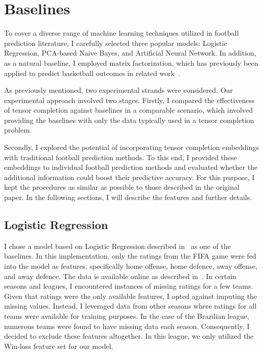 \documentclass[thesis=M,english]{FITthesis}[2019/12/23]
\begin{document}
\section{Baselines}
\label{baselines}

To cover a diverse range of machine learning techniques utilized in football prediction literature, I carefully selected three popular models: Logistic Regression, PCA-based Naive Bayes, and Artificial Neural Network. In addition, as a natural baseline, I employed matrix factorization, which has previously been applied to predict basketball outcomes in related work~\cite{NBA_matrix_factorization}.

As previously mentioned, two experimental strands were considered. Our experimental approach involved two stages. Firstly, I compared the effectiveness of tensor completion against baselines in a comparable scenario, which involved providing the baselines with only the data typically used in a tensor completion problem.

Secondly, I explored the potential of incorporating tensor completion embeddings with traditional football prediction methods. To this end, I provided these embeddings to individual football prediction methods and evaluated whether the additional information could boost their predictive accuracy. For this purpose, I kept the procedures as similar as possible to those described in the original paper. In the following sections, I will describe the features and further details.

\subsection{Logistic Regression}
\label{lr}
I chose a model based on Logistic Regression described in~\cite{BPL_logistic_regression} as one of the baselines. In this implementation, only the ratings from the FIFA game were fed into the model as features, specifically home offense, home defence, away offense, and away defence. The data is available online as described in~\cite{BPL_logistic_regression}. In certain seasons and leagues, I encountered instances of missing ratings for a few teams. Given that ratings were the only available features, I opted against imputing the missing values. Instead, I leveraged data from other seasons where ratings for all teams were available for training purposes. In the case of the Brazilian league, numerous teams were found to have missing data each season. Consequently, I decided to exclude these features altogether. In this league, we only utilized the Win-loss feature set for our model.
\end{document}
